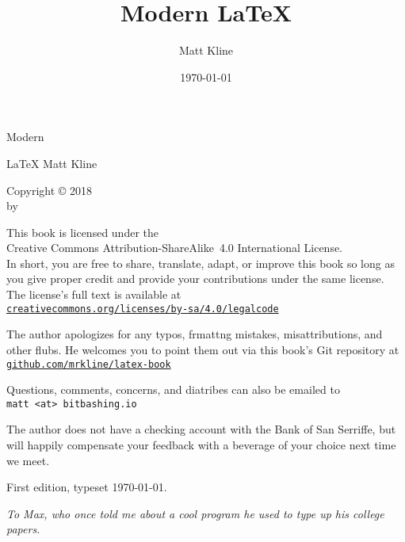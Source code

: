 \documentclass[fontsize=11bp, numbers=endperiod, draft=false]{scrbook}
\title{Modern \texorpdfstring{\LaTeX}{LaTeX}}
\author{Matt Kline}
\date{\today}
\makeatletter
\newcommand{\https}[1]{\href{https://#1}{\texttt{#1}}}
\let\runauthor\@author
\makeatother
\begin{document}
\fontsize{11bp}{13bp}\selectfont

\frontmatter
\setcounter{secnumdepth}{0}
\setlength\parindent{0pt}

{}
\vspace*{1in}
\begin{center}
\fontsize{0.5in}{0.7in}\selectfont
Modern

\fontsize{1in}{0.9in}\selectfont
\LaTeX
\vfill
\LARGE
Matt Kline
\end{center}
\clearpage

{\raggedright%
\null
\vfill
{
Copyright © 2018 \\
by \runauthor
\bigskip

This book is licensed under the \\
Creative Commons Attribution-ShareAlike~4.0 International License. \\
In short, you are free to share, translate, adapt, or improve this book
so long as you give proper credit and provide your contributions under
the same license. \\
The license's full text is available at \\
\https{creativecommons.org/licenses/by-sa/4.0/legalcode}
}
\vfill

The author apologizes for any typos,
f\raisebox{-0.1ex}{o}rmatt\raisebox{0.1ex}{i}ng mistakes,
misattributions,
and other flubs.
He welcomes you to point them out via this book's Git repository at \\
\https{github.com/mrkline/latex-book}

\vspace{\baselineskip}
Questions, comments, concerns, and diatribes can also be emailed to \\
\texttt{matt <at> bitbashing.io}

\vspace{\baselineskip}
The author does not have a checking account with the Bank of San Serriffe,
but will happily compensate your feedback with a beverage of your choice
next time we meet.

\vspace{0.5in}
First edition, typeset \today.
} %
\clearpage

\vspace*{1in}
{\itshape%
To Max, who once told me about a cool program he used to type up
his college papers.
}
\cleardoublepage
\end{document}
